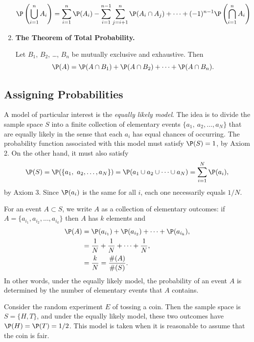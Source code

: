 \documentclass[captions=tableheading]{scrbook}
\begin{document}
\begin{enumerate}
  \begin{equation}
  \P\left(\bigcup_{i=1}^{n}A_{i}\right)=\sum_{i=1}^{n}\P(A_{i})-\sum_{i=1}^{n-1}\sum_{j=i+1}^{n}\P(A_{i}\cap A_{j})+\cdots+(-1)^{n-1}\P\left(\bigcap_{i=1}^{n}A_{i}\right)
  \end{equation}
\item \textbf{The Theorem of Total Probability.} 

  Let \(B_{1}\), \(B_{2}\), \ldots{}, \(B_{n}\) be mutually exclusive and exhaustive. Then
  \begin{equation}
  \P(A)=\P(A\cap B_{1})+\P(A\cap B_{2})+\cdots+\P(A\cap B_{n}).\label{eq:theorem-total-probability}
  \end{equation}
\end{enumerate}
\subsection{Assigning Probabilities}
\label{sec-4-4-3}


A model of particular interest is the \emph{equally likely model}. The idea is to divide the sample space \(S\) into a finite collection of elementary events \( \{ a_{1},\ a_{2}, \ldots, a_{N} \} \) that are equally likely in the sense that each \(a_{i}\) has equal chances of occurring. The probability function associated with this model must satisfy \(\P(S)=1\), by Axiom 2. On the other hand, it must also satisfy
\[
\P(S)=\P( \{ a_{1},\ a_{2},\ldots,a_{N} \} )=\P(a_{1}\cup a_{2}\cup\cdots\cup a_{N})=\sum_{i=1}^{N}\P(a_{i}),
\]
by Axiom 3. Since \(\P(a_{i})\) is the same for all \(i\), each one necessarily equals \(1/N\). 

For an event \(A\subset S\), we write \(A\) as a collection of elementary outcomes: if \( A = \{ a_{i_{1}}, a_{i_{2}}, \ldots, a_{i_{k}} \} \) then \(A\) has \(k\) elements and 
\begin{align*}
\P(A) & =\P(a_{i_{1}})+\P(a_{i_{2}})+\cdots+\P(a_{i_{k}}),\\
 & =\frac{1}{N}+\frac{1}{N}+\cdots+\frac{1}{N},\\  & =\frac{k}{N}=\frac{\#(A)}{\#(S)}.
\end{align*}
In other words, under the equally likely model, the probability of an event \(A\) is determined by the number of elementary events that \(A\) contains. 

\begin{example}
Consider the random experiment \(E\) of tossing a coin. Then the sample space is \(S=\{H,T\}\), and under the equally likely model, these two outcomes have \(\P(H)=\P(T)=1/2\). This model is taken when it is reasonable to assume that the coin is fair.
\end{example}
\end{document}
